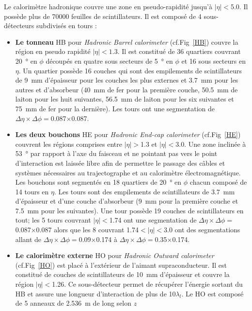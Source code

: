 Le calorimètre hadronique couvre une zone en pseudo-rapidité jusqu'à $|\eta|<$\num{5.0}. Il possède plus de \num{70000} feuilles de scintillateurs. Il est composé de \num{4} sous-détecteurs subdivisés en tours : 
\begin{itemize}[label=$\bullet$]
	\item \textbf{Le tonneau} HB pour \textit{Hadronic Barrel calorimeter} (cf.Fig~\ref{HB}) couvre la région en pseudo rapidité $|\eta|<1.3$. Il est constitué de \num{36} quartiers couvrant \SI{20}{\degree} en $\phi$ découpés en quatre sous secteurs de \SI{5}{\degree} en $\phi$ et \num{16} sous secteurs en $\eta$. Un quartier possède \num{16} couches qui sont des empilements de scintillateurs de \SI{9}{\milli\meter} d'épaisseur pour les couches les plus externes et \SI{3.7}{\milli\meter} pour les autres et d'absorbeur (\SI{40}{\milli\meter} de fer pour la première couche, \SI{50.5}{\milli\meter} de laiton pour les huit suivantes, \SI{56.5}{\milli\meter} de laiton pour les six suivantes et \SI{75}{\milli\meter} de fer pour la dernière). Les tours ont une segmentation de $\Delta\eta\times\Delta\phi=$\num{0.087}$\times$\num{0.087}.
	\item \textbf{Les deux bouchons} HE pour \textit{Hadronic End-cap calorimeter} (cf.Fig~\ref{HE}) couvrent les régions comprises entre $|\eta|>$\num{1.3} et $|\eta|<$\num{3.0}. Une zone inclinée à \SI{53}{\degree} par rapport à l'axe du faisceau et ne pointant pas vers le point d'interaction est laissée libre afin de permettre le passage des câbles et systèmes nécessaires au trajectographe et au calorimètre électromagnétique. Les bouchons sont segmentés en \num{18} quartiers de \SI{20}{\degree} en $\phi$ chacun composé de \num{14} tours en $\eta$. Les tours sont des empilements de scintillateurs de \SI{3.7}{\milli\meter} d'épaisseur et d'une couche d'absorbeur (\SI{9}{\milli\meter} pour la première couche et \SI{7.5}{\milli\meter} pour les suivantes). Une tour possède \num{19} couches de  scintillateurs en tout; les \num{5} tours couvrant $|\eta|<$\num{1.74} ont une segmentation de $\Delta\eta\times\Delta\phi=$\num{0.087}$\times$\num{0.087} alors que les \num{8} couvrant \num{1.74}$<|\eta|<$\num{3.0} ont des segmentations allant de $\Delta\eta\times\Delta\phi=$\num{0.09}$\times$\num{0.174} à $\Delta\eta\times\Delta\phi=$\num{0.35}$\times$\num{0.174}.
	\item \textbf{Le calorimètre externe} HO pour \textit{Hadronic Outward calorimeter} (cf.Fig~\ref{HO}) est placé à l'extérieur de l'aimant supraconducteur. Il est constitué de couches de scintillateurs de \SI{10}{\milli\meter} d'épaisseur et couvre la région $|\eta|<$\num{1.26}. Ce sous-détecteur permet de récupérer l'énergie sortant du HB et assure une longueur d'interaction de plus de \num{10}$\lambda_{l}$. Le HO est composé de \num{5} anneaux de \SI{2.536}{\meter} de long selon $z$ 

\end{itemize}
